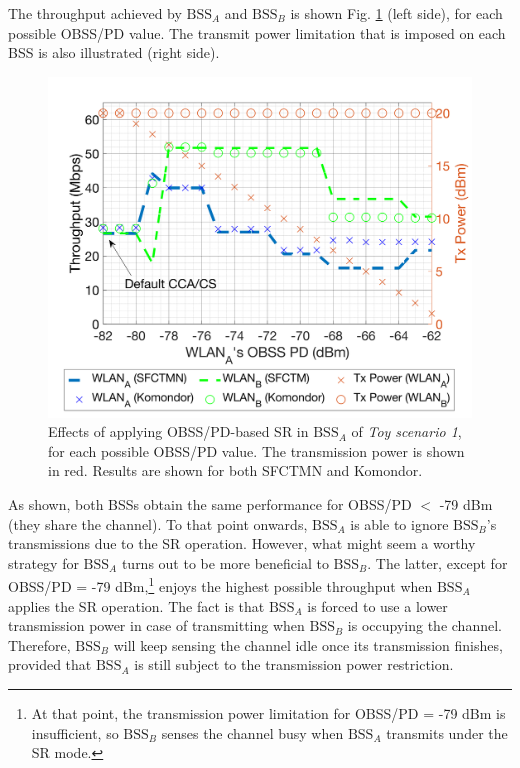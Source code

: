 \documentclass{ieeeaccess}
\begin{document}
The throughput achieved by $\text{BSS}_A$ and $\text{BSS}_B$ is shown Fig. \ref{fig:toy_scenario_1_results} (left side), for each possible OBSS/PD value. The transmit power limitation that is imposed on each BSS is also illustrated (right side).  
\begin{figure}[ht!]
	\centering
	\includegraphics[width=\columnwidth]{SIM_1_1}
	\caption{Effects of applying OBSS/PD-based SR in $\text{BSS}_A$ of \emph{Toy scenario 1}, for each possible OBSS/PD value. The transmission power is shown in red. Results are shown for both SFCTMN and Komondor.}		\label{fig:toy_scenario_1_results}
\end{figure}

As shown, both BSSs obtain the same performance for OBSS/PD $<$ -79 dBm (they share the channel). To that point onwards, $\text{BSS}_A$ is able to ignore $\text{BSS}_B$'s transmissions due to the SR operation. However, what might seem a worthy strategy for $\text{BSS}_A$ turns out to be more beneficial to $\text{BSS}_B$. The latter, except for OBSS/PD = -79 dBm,\footnote{At that point, the transmission power limitation for OBSS/PD = -79 dBm is insufficient, so $\text{BSS}_B$ senses the channel busy when $\text{BSS}_A$ transmits under the SR mode.} enjoys the highest possible throughput when $\text{BSS}_A$ applies the SR operation. The fact is that $\text{BSS}_A$ is forced to use a lower transmission power in case of transmitting when $\text{BSS}_B$ is occupying the channel. Therefore, $\text{BSS}_B$ will keep sensing the channel idle once its transmission finishes, provided that $\text{BSS}_A$ is still subject to the transmission power restriction.
\end{document}

